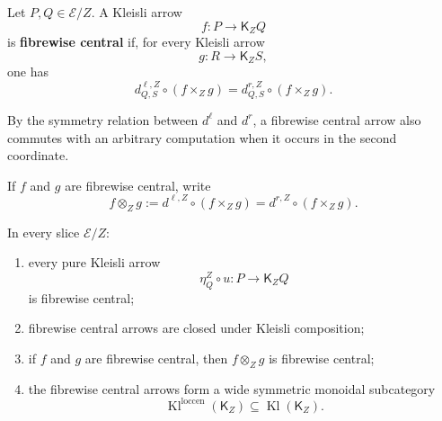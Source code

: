 \begin{definition}
\label{def:fibrewise-central-kleisli-arrow}
Let \(P,Q\in\mathcal E/Z\).  A Kleisli arrow
\[
    f:P\longrightarrow\mathsf K_ZQ
\]
is \textbf{fibrewise central} if, for every Kleisli arrow
\[
    g:R\longrightarrow\mathsf K_ZS,
\]
one has
\[
    d^{\ell,Z}_{Q,S}
    \circ
    (f\times_Zg)
    =
    d^{r,Z}_{Q,S}
    \circ
    (f\times_Zg).
\]
\end{definition}

By the symmetry relation between \(d^\ell\) and \(d^r\), a fibrewise central
arrow also commutes with an arbitrary computation when it occurs in the
second coordinate.

If \(f\) and \(g\) are fibrewise central, write
\[
    f\otimes_Zg
    :=
    d^{\ell,Z}\circ(f\times_Zg)
    =
    d^{r,Z}\circ(f\times_Zg).
\]

\begin{proposition}
\label{prop:local-central-arrow-closure}
In every slice \(\mathcal E/Z\):
\begin{enumerate}
    \item every pure Kleisli arrow
    \[
        \eta^Z_Q\circ u:P\to\mathsf K_ZQ
    \]
    is fibrewise central;

    \item fibrewise central arrows are closed under Kleisli composition;

    \item if \(f\) and \(g\) are fibrewise central, then
    \(f\otimes_Zg\) is fibrewise central;

    \item the fibrewise central arrows form a wide symmetric monoidal
    subcategory
    \[
        \operatorname{Kl}^{\mathrm{loccen}}(\mathsf K_Z)
        \subseteq
        \operatorname{Kl}(\mathsf K_Z).
    \]
\end{enumerate}
\end{proposition}

